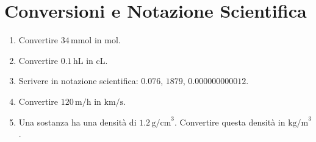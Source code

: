 \documentclass[12pt]{article}
\begin{document}
\section{Conversioni e Notazione Scientifica}
    \begin{enumerate}[label=\alph*)]
        \item Convertire $34 \, \text{mmol}$ in mol.
        \item Convertire $0.1 \, \text{hL}$ in cL.
        \item Scrivere in notazione scientifica: $0.076$, $1879$, $0.000000000012$.
        \item Convertire $120 \, \text{m/h}$ in $\text{km/s}$.
        \item Una sostanza ha una densità di $1.2 \, \text{g/cm}^3$. Convertire questa densità in $\text{kg/m}^3$.
    \end{enumerate}
\end{document}
